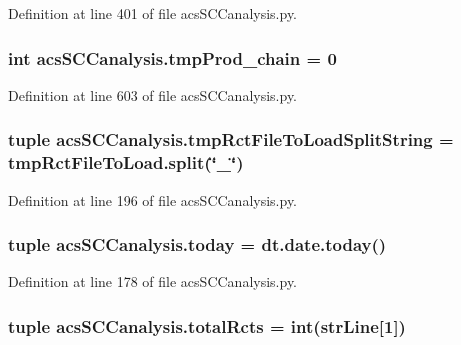 Definition at line 401 of file acs\-S\-C\-Canalysis.\-py.

\hypertarget{a00102_aee6b4f50387d471b70458cf703c0863b}{
\subsubsection[{tmp\-Prod\-\_\-chain}]{\setlength{\rightskip}{0pt plus 5cm}int acs\-S\-C\-Canalysis.\-tmp\-Prod\-\_\-chain = 0}}\label{a00102_aee6b4f50387d471b70458cf703c0863b}


Definition at line 603 of file acs\-S\-C\-Canalysis.\-py.

\hypertarget{a00102_add910e17b3f1fe61cdbaf8ce60ec0e20}{
\subsubsection[{tmp\-Rct\-File\-To\-Load\-Split\-String}]{\setlength{\rightskip}{0pt plus 5cm}tuple acs\-S\-C\-Canalysis.\-tmp\-Rct\-File\-To\-Load\-Split\-String = {\bf tmp\-Rct\-File\-To\-Load.\-split}(\char`\"{}\-\_\-\char`\"{})}}\label{a00102_add910e17b3f1fe61cdbaf8ce60ec0e20}


Definition at line 196 of file acs\-S\-C\-Canalysis.\-py.

\hypertarget{a00102_a5498b0a6851ae4d3b2c3035093564e47}{
\subsubsection[{today}]{\setlength{\rightskip}{0pt plus 5cm}tuple acs\-S\-C\-Canalysis.\-today = dt.\-date.\-today()}}\label{a00102_a5498b0a6851ae4d3b2c3035093564e47}


Definition at line 178 of file acs\-S\-C\-Canalysis.\-py.

\hypertarget{a00102_a9f0e87ff21f3597668f5ad076224da87}{
\subsubsection[{total\-Rcts}]{\setlength{\rightskip}{0pt plus 5cm}tuple acs\-S\-C\-Canalysis.\-total\-Rcts = int({\bf str\-Line}\mbox{[}1\mbox{]})}}\label{a00102_a9f0e87ff21f3597668f5ad076224da87}


